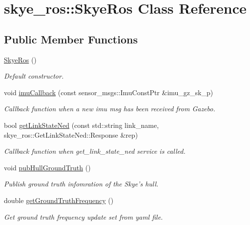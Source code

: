 \hypertarget{classskye__ros_1_1_skye_ros}{\section{skye\-\_\-ros\-:\-:Skye\-Ros Class Reference}
\label{classskye__ros_1_1_skye_ros}
}
\subsection*{Public Member Functions}
\begin{DoxyCompactItemize}
\item 
\hypertarget{classskye__ros_1_1_skye_ros_a267dbb96c571ccfb1bea0a082b5cfb32}{\hyperlink{classskye__ros_1_1_skye_ros_a267dbb96c571ccfb1bea0a082b5cfb32}{Skye\-Ros} ()}\label{classskye__ros_1_1_skye_ros_a267dbb96c571ccfb1bea0a082b5cfb32}

\begin{DoxyCompactList}\small\item\em Default constructor. \end{DoxyCompactList}\item 
void \hyperlink{classskye__ros_1_1_skye_ros_a7fce94bed2f513ee63aac089ccf40538}{imu\-Callback} (const sensor\-\_\-msgs\-::\-Imu\-Const\-Ptr \&imu\-\_\-gz\-\_\-sk\-\_\-p)
\begin{DoxyCompactList}\small\item\em Callback function when a new imu msg has been received from Gazebo. \end{DoxyCompactList}\item 
bool \hyperlink{classskye__ros_1_1_skye_ros_ac4bd9e5c80045fdf72a0e43eb43434e2}{get\-Link\-State\-Ned} (const std\-::string link\-\_\-name, skye\-\_\-ros\-::\-Get\-Link\-State\-Ned\-::\-Response \&rep)
\begin{DoxyCompactList}\small\item\em Callback function when get\-\_\-link\-\_\-state\-\_\-ned service is called. \end{DoxyCompactList}\item 
void \hyperlink{classskye__ros_1_1_skye_ros_a8e2c41ab1a0aa514dff6d31aa6fcd008}{pub\-Hull\-Ground\-Truth} ()
\begin{DoxyCompactList}\small\item\em Publish ground truth infomration of the Skye's hull. \end{DoxyCompactList}\item 
double \hyperlink{classskye__ros_1_1_skye_ros_aa325d6b4adfceebf2cb630a56baae8b8}{get\-Ground\-Truth\-Frequency} ()
\begin{DoxyCompactList}\small\item\em Get ground truth frequency update set from yaml file. \end{DoxyCompactList}\end{DoxyCompactItemize}


